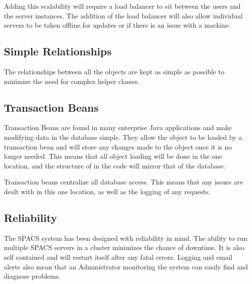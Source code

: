 \par
Adding this scalability will require a load balancer to sit between the users and the server instances. The addition of the load balancer will also allow individual servers to be taken offline for updates or if there is an issue with a machine.

\subsection{Simple Relationships}
\par
The relationships between all the objects are kept as simple as possible to minimize the need for complex helper classes.

\subsection{Transaction Beans}
\par
Transaction Beans are found in many enterprise Java applications and make modifying data in the database simple. They allow the object to be loaded by a transaction bean and will store any changes made to the object once it is no longer needed. This means that all object loading will be done in the one location, and the structure of in the code will mirror that of the database.

\par
Transaction beans centralize all database access. This means that any issues are dealt with in this one location, as well as the logging of any requests.

\subsection{Reliability}
\par
The SPACS system has been designed with reliability in mind. The ability to run multiple SPACS servers in a cluster minimizes the chance of downtime. It is also self contained and will restart itself after any fatal errors. Logging and email alerts also mean that an Administrator monitoring the system can easily find and diagnose problems.

































